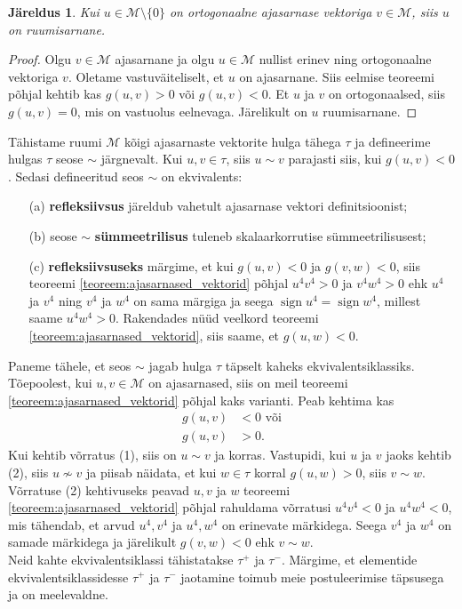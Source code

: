 \documentclass[a4paper,12pt]{article}
\theoremstyle{plain}
\newtheorem{jareldus}{Järeldus}[section]
\theoremstyle{definition}
\numberwithin{equation}{section}
\def\M{{\mathcal M}}
\DeclareMathOperator{\sign}{sign}
\begin{document}
\begin{jareldus}
Kui $u \in \M \setminus \{0\}$ on ortogonaalne ajasarnase vektoriga $v \in \M$, siis $u$ on ruumisarnane.
\end{jareldus}
\begin{proof}
Olgu $v \in \M$ ajasarnane ja olgu $u \in \M$ nullist erinev ning ortogonaalne vektoriga $v$. Oletame vastuväiteliselt, et $u$ on ajasarnane. Siis eelmise teoreemi põhjal kehtib kas $g\left(u,v\right) > 0$ või $g\left(u,v\right) < 0$. Et $u$ ja $v$ on ortogonaalsed, siis $g\left(u,v\right) = 0$, mis on vastuolus eelnevaga. Järelikult on $u$ ruumisarnane.
\end{proof}

Tähistame ruumi $\M$ kõigi ajasarnaste vektorite hulga tähega $\tau$ ja defineerime hulgas $\tau$ seose $\sim$ järgnevalt. Kui $u,v \in \tau$, siis $u \sim v$ parajasti siis, kui $g\left(u,v\right) < 0$. Sedasi defineeritud seos $\sim$ on ekvivalents:
\begin{itemize}
\item[(a)] \textbf{refleksiivsus} järeldub vahetult ajasarnase vektori definitsioonist;
\item[(b)] seose $\sim$ \textbf{sümmeetrilisus} tuleneb skalaarkorrutise sümmeetrilisusest;
\item[(c)] \textbf{refleksiivsuseks} märgime, et kui $g\left(u,v\right) < 0$ ja $g\left(v, w\right) < 0$, siis teoreemi \ref{teoreem:ajasarnased_vektorid} põhjal $u^4 v^4 > 0$ ja $v^4 w^4 > 0$ ehk $u^4$ ja $v^4$ ning $v^4$ ja $w^4$ on sama märgiga ja seega $\sign u^4 = \sign w^4$, millest saame $u^4 w^4 > 0$. Rakendades nüüd veelkord teoreemi \ref{teoreem:ajasarnased_vektorid}, siis saame, et $g\left(u, w\right) < 0$.
\end{itemize}
Paneme tähele, et seos $\sim$ jagab hulga $\tau$ täpselt kaheks ekvivalentsiklassiks. Tõe\-poolest,
kui $u, v \in \M$ on ajasarnased, siis on meil teoreemi \ref{teoreem:ajasarnased_vektorid} põhjal kaks varianti. Peab kehtima kas 
\begin{align}
g\left(u,v\right) &< 0 \text{ või} \tag{1} \\
g\left(u,v\right) &> 0. \tag{2}
\end{align}
Kui kehtib võrratus (1), siis on $u \sim v$ ja korras. Vastupidi, kui $u$ ja $v$ jaoks kehtib (2), siis $u \nsim v$ ja piisab näidata, et kui $w \in \tau$ korral $g\left(u,w\right) > 0$, siis $v \sim w$. Võrratuse (2) kehtivuseks peavad $u, v$ ja $w$ teoreemi \ref{teoreem:ajasarnased_vektorid} põhjal rahuldama võrratusi $u^4 v^4 < 0$ ja $u^4 w^4 < 0$, mis tähendab, et arvud $u^4, v^4$ ja $u^4, w^4$ on erinevate märkidega. Seega $v^4$ ja $w^4$ on samade märkidega ja järelikult $g\left(v,w\right) < 0$ ehk $v \sim w$. \\
Neid kahte ekvivalentsiklassi tähistatakse $\tau^+$ ja $\tau^-$. Märgime, et elementide ekvivalentsiklassidesse $\tau^+$ ja $\tau^-$ jaotamine toimub meie postuleerimise täpsusega ja on meelevaldne.
\end{document}
